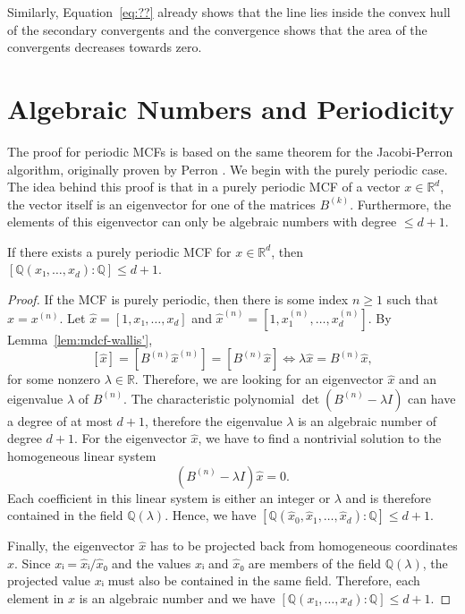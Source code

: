 Similarly,
Equation~\ref{eq:??} already shows that the line lies inside the convex hull of
the secondary convergents
and the convergence shows that the area of the convergents decreases towards zero.
\fi

\section{Algebraic Numbers and Periodicity}

The proof for periodic MCFs is based on the same theorem for the Jacobi-Perron
algorithm, originally proven by Perron \cite{Perron07}.
We begin with the purely periodic case.
The idea behind this proof is that in a purely periodic MCF of a vector $x ∈ ℝ^d$,
the vector itself is an eigenvector for one of the matrices $B^{(k)}$.
Furthermore, the elements of this eigenvector can only be algebraic numbers with degree $≤ d+1$.

\begin{lemma}
  \label{lem:mdcf-purely-periodic}
  If there exists a purely periodic MCF for $x ∈ ℝ^d$,
  then $[ℚ(x₁, …, x_d) : ℚ] ≤ d+1$.
\end{lemma}

\begin{proof}
  If the MCF is purely periodic, then there is some index $n ≥ 1$ such that $x = x^{(n)}$.
  Let $\hat x = [1, x₁, …, x_d]$ and $\hat x^{(n)} = [1, x_1^{(n)}, …, x_d^{(n)}]$.
  By Lemma~\ref{lem:mdcf-wallis'},
  \[
    [\hat x] = [B^{(n)} \hat x^{(n)}] = [B^{(n)} \hat x] \iff λ \hat x = B^{(n)} \hat x,
  \]
  for some nonzero $λ ∈ ℝ$.
  Therefore, we are looking for an eigenvector $\hat x$ and an eigenvalue $λ$ of $B^{(n)}$.
  The characteristic polynomial $\det(B^{(n)} - λ I)$ can have a degree of at most $d+1$,
  therefore the eigenvalue $λ$ is an algebraic number of degree $d+1$.
  For the eigenvector $\hat x$, we have to find a nontrivial solution to the
  homogeneous linear system
  \[
    (B^{(n)} - λ I) \hat x = 0.
  \]
  Each coefficient in this linear system is either an integer or $λ$ and is
  therefore contained in the field $ℚ(λ)$.
  Hence, we have $[ℚ(\hat x_0, \hat x_1, …, \hat x_d) : ℚ] ≤ d+1$.

  Finally, the eigenvector $\hat x$ has to be projected back from homogeneous coordinates $x$.
  Since $xᵢ = \hat xᵢ / \hat x₀$ and the values $\hat xᵢ$ and $\hat x₀$ are members of the field $ℚ(λ)$,
  the projected value $xᵢ$ must also be contained in the same field.
  Therefore, each element in $x$ is an algebraic number
  and we have $[ℚ(x₁, …, x_d) : ℚ] ≤ d+1$.
\end{proof}

